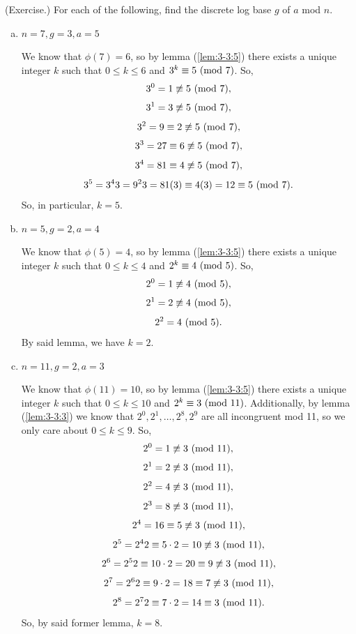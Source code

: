 \documentclass[letterpaper]{article}
\begin{document}
\begin{mdframed}
    (Exercise.) For each of the following, find the discrete log base $g$ of $a$ mod $n$. 
    \begin{enumerate}[(a)]
        \item $n = 7, g = 3, a = 5$
        \begin{mdframed}
            We know that $\phi(7) = 6$, so by lemma (\ref{lem:3-3:5}) there exists a unique integer $k$ such that $0 \leq k \leq 6$ and $3^k \equiv 5 \ (\mathrm{mod}\ 7)$. So, 
            \[3^0 = 1 \not\equiv 5 \ (\mathrm{mod}\ 7),\]
            \[3^1 = 3 \not\equiv 5 \ (\mathrm{mod}\ 7),\]
            \[3^2 = 9 \equiv 2 \not\equiv 5 \ (\mathrm{mod}\ 7),\]
            \[3^3 = 27 \equiv 6 \not\equiv 5 \ (\mathrm{mod}\ 7),\]
            \[3^4 = 81 \equiv 4 \not\equiv 5 \ (\mathrm{mod}\ 7),\]
            \[3^5 = 3^4 3 = 9^2 3 = 81(3) \equiv 4(3) = 12 \equiv 5 \ (\mathrm{mod}\ 7).\]
            So, in particular, $k = 5$. 
        \end{mdframed}
        \item $n = 5, g = 2, a = 4$
        \begin{mdframed}
            We know that $\phi(5) = 4$, so by lemma (\ref{lem:3-3:5}) there exists a unique integer $k$ such that $0 \leq k \leq 4$ and $2^k \equiv 4 \ (\mathrm{mod}\ 5)$. So, 
            \[2^0 = 1 \not\equiv 4 \ (\mathrm{mod}\ 5),\]
            \[2^1 = 2 \not\equiv 4 \ (\mathrm{mod}\ 5),\]
            \[2^2 = 4 \ (\mathrm{mod}\ 5).\]
            By said lemma, we have $k = 2$. 
        \end{mdframed}
        \item $n = 11, g = 2, a = 3$
        \begin{mdframed}
            We know that $\phi(11) = 10$, so by lemma (\ref{lem:3-3:5}) there exists a unique integer $k$ such that $0 \leq k \leq 10$ and $2^k \equiv 3 \ (\mathrm{mod}\ 11)$. Additionally, by lemma (\ref{lem:3-3:3}) we know that $2^0, 2^1, \hdots, 2^8, 2^9$ are all incongruent mod 11, so we only care about $0 \leq k \leq 9$. So, 
            \[2^0 = 1 \not\equiv 3 \ (\mathrm{mod}\ 11),\]
            \[2^1 = 2 \not\equiv 3 \ (\mathrm{mod}\ 11),\]
            \[2^2 = 4 \not\equiv 3 \ (\mathrm{mod}\ 11),\]
            \[2^3 = 8 \not\equiv 3 \ (\mathrm{mod}\ 11),\]
            \[2^4 = 16 \equiv 5 \not\equiv 3 \ (\mathrm{mod}\ 11),\]
            \[2^5 = 2^4 2 \equiv 5 \cdot 2 = 10 \not\equiv 3 \ (\mathrm{mod}\ 11),\]
            \[2^6 = 2^5 2 \equiv 10 \cdot 2 = 20 \equiv 9 \not\equiv 3 \ (\mathrm{mod}\ 11),\]
            \[2^7 = 2^6 2 \equiv 9 \cdot 2 = 18 \equiv 7 \not\equiv 3 \ (\mathrm{mod}\ 11),\]
            \[2^8 = 2^7 2 \equiv 7 \cdot 2 = 14 \equiv 3 \ (\mathrm{mod}\ 11).\]
            So, by said former lemma, $k = 8$. 
        \end{mdframed}
    \end{enumerate}
\end{mdframed}
\end{document}
